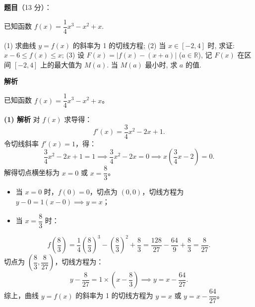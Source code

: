 \begin{answer}

\textbf{题目}（13 分）：

已知函数 $f(x) = \dfrac{1}{4}x^3 - x^2 + x$.

(1) 求曲线 $y = f(x)$ 的斜率为 1 的切线方程;  
(2) 当 $x \in [-2, 4]$ 时, 求证: $x - 6 \leqslant f(x) \leqslant x$;  
(3) 设 $F(x) = |f(x) - (x + a)|$ ($a \in \mathbb{R}$), 记 $F(x)$ 在区间 $[-2, 4]$ 上的最大值为 $M(a)$. 当 $M(a)$ 最小时, 求 $a$ 的值.

\textbf{解析}

已知函数 $f(x) = \dfrac{1}{4}x^3 - x^2 + x$。

\textbf{(1) 解析}
对 $f(x)$ 求导得：
\nopagebreak[4]
\[f'(x) = \frac{3}{4}x^2 - 2x + 1.\]
令切线斜率 $f'(x) = 1$，得：
\nopagebreak[4]
\[\frac{3}{4}x^2 - 2x + 1 = 1 \implies \frac{3}{4}x^2 - 2x = 0 \implies x\left(\frac{3}{4}x - 2\right) = 0.\]
解得切点横坐标为 $x = 0$ 或 $x = \dfrac{8}{3}$。
\begin{itemize}
\item 当 $x = 0$ 时，$f(0) = 0$，切点为 $(0, 0)$，切线方程为 $y - 0 = 1(x - 0) \implies y = x$；
\item 当 $x = \dfrac{8}{3}$ 时：
\end{itemize}
\nopagebreak[4]
\[f\left(\frac{8}{3}\right) = \frac{1}{4}\left(\frac{8}{3}\right)^3 - \left(\frac{8}{3}\right)^2 + \frac{8}{3} = \frac{128}{27} - \frac{64}{9} + \frac{8}{3} = \frac{8}{27}.\]
  切点为 $\left(\dfrac{8}{3}, \dfrac{8}{27}\right)$，切线方程为：
\nopagebreak[4]
\[y - \frac{8}{27} = 1 \times \left(x - \frac{8}{3}\right) \implies y = x - \frac{64}{27}.\]
综上，曲线 $y = f(x)$ 的斜率为 1 的切线方程为 $y = x$ 或 $y = x - \dfrac{64}{27}$。


\end{answer}
